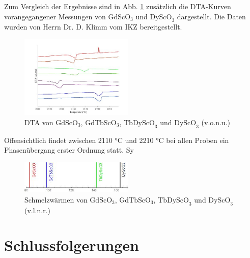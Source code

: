 \documentclass[aps,twocolumn,secnumarabic,nobalancelastpage,amsmath,amssymb,
nofootinbib,superscriptaddress]{revtex4-1}
\begin{document}
\noindent Zum Vergleich der Ergebnisse sind in Abb. \ref{fig:dtaAll} zusätzlich die DTA-Kurven vorangegangener Messungen von $\text{GdScO}_3$ und $\text{DyScO}_3$ dargestellt.
Die Daten wurden von Herrn Dr. D. Klimm vom IKZ bereitgestellt.

\begin{figure}[h]
  \centering
   \includegraphics[width=0.48\textwidth]{../img/vglSkandate.jpg}
  \caption{\label{fig:dtaAll} DTA von $\text{GdScO}_3$, $\text{GdTbScO}_3$, $\text{TbDyScO}_3$ und $\text{DyScO}_3$ (v.o.n.u.) }
\end{figure}

Offensichtlich findet zwischen 2110 °C und 2210 °C bei allen Proben ein Phasenübergang erster Ordnung statt. Sy

\begin{figure}[h]
  \centering
   \includegraphics[width=0.48\textwidth]{../img/plotSchmelzwaermen.jpg}
  \caption{\label{fig:QAll} Schmelzwärmen von $\text{GdScO}_3$, $\text{GdTbScO}_3$, $\text{TbDyScO}_3$ und $\text{DyScO}_3$ (v.l.n.r.) }
\end{figure}


\section{Schlussfolgerungen}

\noindent


\end{document}
